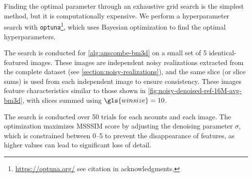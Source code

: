 
Finding the optimal parameter through an exhaustive grid search is the simplest method, but it is computationally expensive. We perform a hyperparameter search with \texttt{optuna}\footnote{\href{https://optuna.org/}{https://optuna.org/} see citation in acknowledgments.}, which uses Bayesian optimization to find the optimal hyperparameters.


The search is conducted for \cref{alg:anscombe-bm3d} on a small set of \num{5} identical-featured images. These images are independent noisy realizations extracted from the complete dataset (see \cref{section:noisy-realizations}), and the same slice (or slice sums) is used from each independent image to ensure consistency. These images feature characteristics similar to those shown in \cref{fig:noisy-denoised-ref-16M-avg-bm3d}, with slices summed using $\gls{winsize} = \num{10}$.

The search is conducted over \num{50} trials for each \gls{ncounts} and each image. The optimization maximizes \gls{MSSSIM} score by adjusting the denoising parameter $\sigma$, which is constrained between \numrange{0}{5} to prevent the disappearance of features, as higher values can lead to significant loss of detail.

